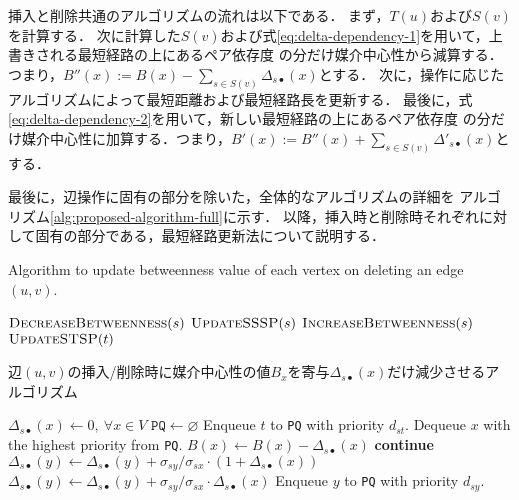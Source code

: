 挿入と削除共通のアルゴリズムの流れは以下である．
まず，$T(u)$および$S(v)$を計算する．
次に計算した$S(v)$および式\eqref{eq:delta-dependency-1}を用いて，上書きされる最短経路の上にあるペア依存度
の分だけ媒介中心性から減算する．つまり，$B''(x):=B(x)-\sum_{s\in S(v)}\Delta_{s\bullet}(x)$とする．
次に，操作に応じたアルゴリズムによって最短距離および最短経路長を更新する．
最後に，式\eqref{eq:delta-dependency-2}を用いて，新しい最短経路の上にあるペア依存度
の分だけ媒介中心性に加算する．つまり，$B'(x):=B''(x)+\sum_{s\in S(v)}\Delta'_{s\bullet}(x)$とする．

最後に，辺操作に固有の部分を除いた，全体的なアルゴリズムの詳細を
アルゴリズム\ref{alg:proposed-algorithm-full}に示す．
以降，挿入時と削除時それぞれに対して固有の部分である，最短経路更新法について説明する．

\begin{algorithm}[tb]
  \caption{Algorithm to update betweenness value of each vertex on deleting an edge $(u,v)$.}
  \label{alg:proposed-algorithm-full}
  \begin{algorithmic}[1]\small
    \State $\textproc{DecreaseBetweenness}(s)$
    \State $\textproc{UpdateSSSP}(s)$
    \State $\textproc{IncreaseBetweenness}(s)$
    \EndFor
    \State $\textproc{UpdateSTSP}(t)$
    \EndFor
    \EndProcedure
  \end{algorithmic}
\end{algorithm}

\begin{algorithm}[tb]
  \caption{辺$(u,v)$の挿入/削除時に媒介中心性の値$B_x$を寄与$\Delta_{s\bullet}(x)$だけ減少させるアルゴリズム}
  \label{alg:decrease-betweenness}
  \begin{algorithmic}[1]\small
    \State $\Delta_{s\bullet}(x)\gets0,\:\forall x\in V$
    \State $\texttt{PQ}\gets\varnothing$
    \State Enqueue $t$ to \texttt{PQ} with priority $d_{st}$.
    \EndFor
    \State Dequeue $x$ with the highest priority from \texttt{PQ}.
    \State $B(x)\gets B(x)-\Delta_{s\bullet}(x)$
    \State \textbf{continue}
    \EndIf
    \State $\Delta_{s\bullet}(y)\gets\Delta_{s\bullet}(y)+\sigma_{sy}/\sigma_{sx}\cdot(1+\Delta_{s\bullet}(x))$
    \Else
    \State $\Delta_{s\bullet}(y)\gets\Delta_{s\bullet}(y)+\sigma_{sy}/\sigma_{sx}\cdot\Delta_{s\bullet}(x)$
    \EndIf
    \State Enqueue $y$ to \texttt{PQ} with priority $d_{sy}$.
    \EndIf
    \EndFor
    \EndWhile
    \EndProcedure
  \end{algorithmic}
\end{algorithm}

